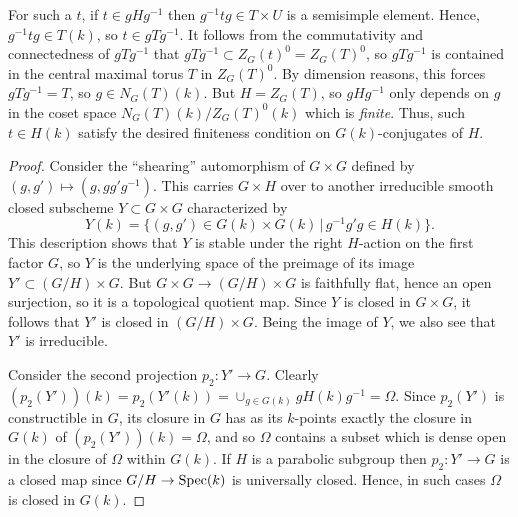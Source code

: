 \documentclass[10pt]{article}
\renewcommand{\(}{\left(}
\renewcommand{\)}{\right)}
\numberwithin{thm}{subsection}
\begin{document}
For such a $t$, if $t \in gHg^{-1}$ then $g^{-1}tg \in T \times U$ is a semisimple
element.  Hence, $g^{-1}tg \in T(k)$, so $t \in g T g^{-1}$. 
It follows from the commutativity and connectedness of $gTg^{-1}$
that $gTg^{-1} \subset Z_G(t)^0 = Z_G(T)^0$, so
$gTg^{-1}$ is contained in the central maximal torus $T$ in $Z_G(T)^0$.  By dimension reasons,
this forces $gTg^{-1} = T$, so $g \in N_G(T)(k)$.   But $H = Z_G(T)$, so
$gHg^{-1}$ only depends on $g$ in the coset space
$N_G(T)(k)/Z_G(T)^0(k)$ which is {\em finite}. 
Thus, such $t \in H(k)$ satisfy the desired finiteness condition on $G(k)$-conjugates of $H$.

\begin{proof}
Consider the ``shearing'' automorphism of $G \times G$ defined by
$(g,g') \mapsto (g, gg' g^{-1})$.  This carries
$G \times H$ over to another irreducible smooth closed subscheme $Y \subset G \times G$
characterized by $$Y(k) = \{(g,g') \in G(k) \times G(k)\,|\,g^{-1}g' g \in H(k)\}.$$
This description shows that $Y$ is stable under the right $H$-action on the first factor $G$, so
$Y$ is the underlying space of the preimage of its image
$Y' \subset (G/H) \times G$.  But $G \times G \rightarrow (G/H) \times G$ is faithfully
flat, hence an open surjection, so it is a topological quotient map.
Since $Y$ is closed in $G \times G$, it follows that
$Y'$ is closed in $(G/H) \times G$.  Being the image of $Y$, we also
see that $Y'$ is irreducible.  

Consider the second projection $p_2:Y' \rightarrow G$.  Clearly
$(p_2(Y'))(k) = p_2(Y'(k)) = \cup_{g \in G(k)} g H(k) g^{-1} = \Omega$.  
Since $p_2(Y')$ is constructible in $G$, its closure in $G$ has
as its $k$-points exactly the closure in $G(k)$ of $(p_2(Y'))(k) = \Omega$,
and so $\Omega$ contains a subset which is dense open in
the closure of $\Omega$ within $G(k)$.
If $H$ is a parabolic subgroup then $p_2:Y' \rightarrow G$ is a closed
map since $G/H \rightarrow {\rm{Spec}}(k)$ is universally closed. 
Hence, in such cases $\Omega$ is closed in $G(k)$. 


\end{proof}
\end{document}
